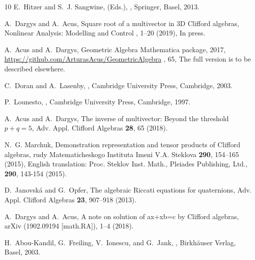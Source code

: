 \documentclass{birkjour}
\begin{document}
\begin{thebibliography}{10}
E.~Hitzer and {S.~J. Sangwine, (Eds.)},
,
\newblock Springer, Basel, 2013.

A.~Dargys and A.~Acus,
\newblock Square root of a multivector in 3D {C}lifford algebras,
\newblock Nonlinear Analysis: Modelling and Control , 1--20 (2019),
\newblock In press.

A.~Acus and A.~Dargys,
\newblock Geometric Algebra Mathematica package, 2017,
\newblock \url{https://github.com/ArturasAcus/GeometricAlgebra} , 65,
\newblock The full version is to be described elsewhere.

C.~Doran and A.~Lasenby,
,
\newblock Cambridge University Press, Cambridge, 2003.

P.~Lounesto,
,
\newblock Cambridge University Press, Cambridge, 1997.

A.~Acus and A.~Dargys,
\newblock The inverse of multivector: Beyond the threshold $p+q=5$,
\newblock Adv. Appl. Clifford Algebras {\bf 28}, 65 (2018).

N.~G. Marchuk,
\newblock Demonstration representation and tensor products of {C}lifford
  algebras,
rudy {M}atematicheskogo {I}nstituta {I}meni {V.A.} {S}teklova {\bf
  290}, 154--165 (2015),
\newblock English translation: Proc. Steklov Inst. Math., Pleiades Publishing,
  Ltd., {\bf 290}, 143-154 (2015).

D.~Janovsk{\'a} and G.~Opfer,
\newblock The algebraic {R}iccati equations for quaternions,
\newblock Adv. Appl. Clifford Algebras {\bf 23}, 907--918 (2013).

A.~Dargys and A.~Acus,
\newblock A note on solution of ax+xb=c by Clifford algebras,
\newblock arXiv (1902.09194 [math.RA]), 1--4 (2018).

H.~Abou-Kandil, G.~Freiling, V.~Ionescu, and G.~Jank,
,
\newblock Birkh{\"a}user Verlag, Basel, 2003.

\end{thebibliography}




\end{document}
